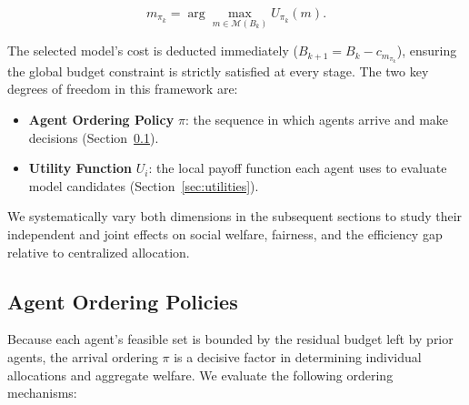 \documentclass{article}
\begin{document}
\begin{equation}
m_{\pi_k} = \arg\max_{m \in \mathcal{M}(B_k)} U_{\pi_k}(m).
\end{equation}

The selected model's cost is deducted immediately ($B_{k+1} = B_k - c_{m_{\pi_k}}$), ensuring the global budget constraint is strictly satisfied at every stage. The two key degrees of freedom in this framework are:

\begin{itemize}[leftmargin=*]
    \item \textbf{Agent Ordering Policy} $\pi$: the sequence in which agents arrive and make decisions (Section~\ref{sec:ordering}).
    \item \textbf{Utility Function} $U_i$: the local payoff function each agent uses to evaluate model candidates (Section~\ref{sec:utilities}).
\end{itemize}

We systematically vary both dimensions in the subsequent sections to study their independent and joint effects on social welfare, fairness, and the efficiency gap relative to centralized allocation.

\subsection{Agent Ordering Policies}
\label{sec:ordering}

Because each agent's feasible set is bounded by the residual budget left by prior agents, the arrival ordering $\pi$ is a decisive factor in determining individual allocations and aggregate welfare. We evaluate the following ordering mechanisms:
\end{document}
